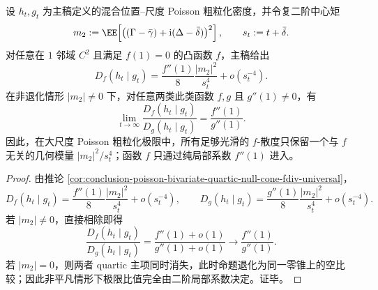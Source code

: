\begin{theorem}\label{thm:conclusion-poisson-fdivergence-universal-ratio}
设 \(h_t,g_t\) 为主稿定义的混合位置--尺度 Poisson 粗粒化密度，并令复二阶中心矩
\[
m_2:=\EE\!\left[\bigl((\Gamma-\bar\gamma)+\mathrm{i}(\Delta-\bar\delta)\bigr)^2\right],
\qquad
s_t:=t+\bar\delta.
\]
对任意在 \(1\) 邻域 \(C^2\) 且满足 \(f(1)=0\) 的凸函数 \(f\)，主稿给出
\[
D_f(h_t\mid g_t)=\frac{f''(1)}{8}\frac{|m_2|^2}{s_t^4}+o(s_t^{-4}).
\]
在非退化情形 \(|m_2|\neq 0\) 下，对任意两类此类函数 \(f,g\) 且 \(g''(1)\neq 0\)，有
\[
\lim_{t\to\infty}\frac{D_f(h_t\mid g_t)}{D_g(h_t\mid g_t)}
=
\frac{f''(1)}{g''(1)}.
\]
因此，在大尺度 Poisson 粗粒化极限中，所有足够光滑的 \(f\)-散度只保留一个与 \(f\) 无关的几何模量 \(|m_2|^2/s_t^4\)；函数 \(f\) 只通过纯局部系数 \(f''(1)\) 进入。
\end{theorem}
\begin{proof}
由推论 \ref{cor:conclusion-poisson-bivariate-quartic-null-cone-fdiv-universal}，
\[
D_f(h_t\mid g_t)=\frac{f''(1)}{8}\frac{|m_2|^2}{s_t^4}+o(s_t^{-4}),
\qquad
D_g(h_t\mid g_t)=\frac{g''(1)}{8}\frac{|m_2|^2}{s_t^4}+o(s_t^{-4}).
\]
若 \(|m_2|\neq 0\)，直接相除即得
\[
\frac{D_f(h_t\mid g_t)}{D_g(h_t\mid g_t)}
=
\frac{f''(1)+o(1)}{g''(1)+o(1)}
\longrightarrow
\frac{f''(1)}{g''(1)}.
\]
若 \(|m_2|=0\)，则两者 quartic 主项同时消失，此时命题退化为同一零锥上的空比较；因此非平凡情形下极限比值完全由二阶局部系数决定。证毕。
\end{proof}

